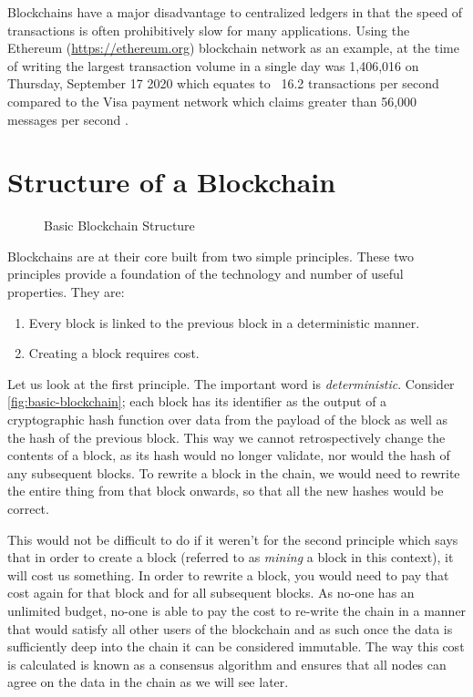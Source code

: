 Blockchains have a major disadvantage to centralized ledgers in that the speed of transactions is often prohibitively slow for many applications. Using the Ethereum (\url{https://ethereum.org}) blockchain network as an example, at the time of writing the largest transaction volume in a single day was 1,406,016 on Thursday, September 17 2020  which equates to ~16.2 transactions per second compared to the Visa payment network which claims greater than 56,000 messages per second .


\section{Structure of a Blockchain}
\label{ch:blockchain:structure}

\begin{figure}[h]
    \centering
    
    \caption{Basic Blockchain Structure}
    \label{fig:basic-blockchain}
\end{figure}

Blockchains are at their core built from two simple principles. These two principles provide a foundation of the technology and number of useful properties. They are:

\begin{enumerate}
    \item Every block is linked to the previous block in a deterministic manner.
    \item Creating a block requires cost.
\end{enumerate}

Let us look at the first principle. The important word is \emph{deterministic}. Consider \autoref{fig:basic-blockchain}; each block has its identifier as the output of a cryptographic hash function over data from the payload of the block as well as the hash of the previous block. This way we cannot retrospectively change the contents of a block, as its hash would no longer validate, nor would the hash of any subsequent blocks. To rewrite a block in the chain, we would need to rewrite the entire thing from that block onwards, so that all the new hashes would be correct.

This would not be difficult to do if it weren't for the second principle which says that in order to create a block (referred to as \emph{mining} a block in this context), it will cost us something. In order to rewrite a block, you would need to pay that cost again for that block and for all subsequent blocks. As no-one has an unlimited budget, no-one is able to pay the cost to re-write the chain in a manner that would satisfy all other users of the blockchain and as such once the data is sufficiently deep into the chain it can be considered immutable. The way this cost is calculated is known as a consensus algorithm and ensures that all nodes can agree on the data in the chain as we will see later.

